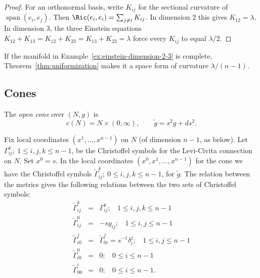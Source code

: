 \begin{proof}
\sketch
{}
\leanok
For an orthonormal basis, write $K_{ij}$ for the sectional curvature
of $\operatorname{span}(e_i,e_j)$. Then
$\Ric(e_i,e_i)=\sum_{j\ne i}K_{ij}$. In dimension $2$ this gives
$K_{12}=\lambda$. In dimension $3$, the three Einstein equations
$K_{12}+K_{13}=K_{12}+K_{23}=K_{13}+K_{23}=\lambda$ force every
$K_{ij}$ to equal $\lambda/2$.
\end{proof}

\begin{remark}
\label{rem:einstein-space-form}

If the manifold in Example~\ref{ex:einstein-dimension-2-3} is
complete, Theorem~\ref{thm:uniformization} makes it a space form of
curvature $\lambda/(n-1)$.
\end{remark}

\subsection{Cones}

\begin{definition}
\label{def:cone}
\leanok
\label{conedefn}
The \emph{open cone} over $(N,g)$ is
\[
  c(N)=N\times(0,\infty),
  \qquad \tilde g=s^2g+ds^2.
\]
\end{definition}

Fix local coordinates $(x^1,\ldots,x^{n-1})$ on $N$ (of dimension
$n-1$, as below). Let
$\Gamma_{ij}^k;\ 1\le i,j,k\le n-1$, be the Christoffel symbols for
the Levi-Civita connection on $N$. Set $x^0=s$. In the local
coordinates $(x^0,x^1,\ldots,x^{n-1})$ for the cone we have the
Christoffel symbols $\widetilde \Gamma_{ij}^k;\ 0\le i,j,k\le n-1$,
for $\tilde g$. The relation between the metrics gives the following
relations between the two sets of Christoffel symbols:
\begin{eqnarray*}\widetilde
\Gamma_{ij}^k & = & \Gamma_{ij}^k; \ \ \ \ 1\le i,j,k\le n-1 \\
\widetilde \Gamma_{ij}^0 & = & -sg_{ij}; \ \ \ \ 1\le i,j\le n-1 \\
\widetilde\Gamma_{i0}^j & = & \widetilde\Gamma_{0i}^j =
s^{-1}\delta^j_i; \ \ \ \ 1\le i,j\le n-1 \\
\widetilde \Gamma_{i0}^0 & = & 0;\ \ \ \ 0\le i\le n-1 \\
\widetilde \Gamma_{00}^i & = & 0;\ \  \ \ 0\le i\le n-1.
\end{eqnarray*}

